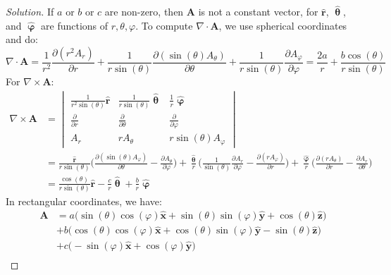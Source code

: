 \documentclass[oneside]{book}
\theoremstyle{mystyle}
\begin{document}
\begin{proof}[Solution]
If $a$ or $b$ or $c$ are non-zero, then $\mathbf{A}$ is not a constant vector, for $\hat{\mathbf{r}}$, $\hat{\boldsymbol{\uptheta}}$, and $\hat{\boldsymbol{\upvarphi}}$ are functions of $r,\theta,\varphi$. To compute $\nabla \cdot \mathbf{A}$, we use spherical coordinates and do:
\begin{equation*}
    \nabla\cdot\mathbf{A}=\frac{1}{r^{2}}\frac{\partial (r^{2}A_{r})}{\partial r}+\frac{1}{r\sin(\theta)}\frac{\partial(\sin(\theta)A_{\theta})}{\partial \theta}+\frac{1}{r\sin(\theta)}\frac{\partial A_{\varphi}}{\partial\varphi}=\frac{2a}{r}+\frac{b\cos(\theta)}{r\sin(\theta)}
\end{equation*}
For $\nabla \times \mathbf{A}$:
\begin{align*}
    \nabla \times \mathbf{A} &= \begin{vmatrix} \frac{1}{r^{2}\sin(\theta)}\hat{\mathbf{r}} & \frac{1}{r\sin(\theta)}\hat{\boldsymbol{\uptheta}} & \frac{1}{r}\hat{\boldsymbol{\upvarphi}}\\ \frac{\partial}{\partial r} & \frac{\partial}{\partial \theta} & \frac{\partial}{\partial \varphi}\\ A_{r} & rA_{\theta} & r\sin(\theta)A_{\varphi} \end{vmatrix}\\
    &= \frac{\hat{\mathbf{r}}}{r\sin(\theta)}\bigg(\frac{\partial (\sin(\theta)A_{\varphi})}{\partial \theta} - \frac{\partial A_{\theta}}{\partial \varphi}\bigg) + \frac{\hat{\boldsymbol{\uptheta}}}{r}\bigg(\frac{1}{\sin(\theta)}\frac{\partial A_{r}}{\partial \varphi} - \frac{\partial (rA_{\varphi})}{\partial r}\bigg)+\frac{\hat{\boldsymbol{\upvarphi}}}{r}\bigg(\frac{\partial (rA_{\theta})}{\partial r} - \frac{\partial A_{r}}{\partial \theta}\bigg)\\
    &= \frac{\cos(\theta)}{r\sin(\theta)}\hat{\mathbf{r}}-\frac{c}{r}\hat{\boldsymbol{\uptheta}}+\frac{b}{r}\hat{\boldsymbol{\upvarphi}}
\end{align*}
In rectangular coordinates, we have:
\begin{align*}
    \mathbf{A}  &= a\big(\sin(\theta)\cos(\varphi)\hat{\mathbf{x}}+\sin(\theta)\sin(\varphi)\hat{\mathbf{y}}+\cos(\theta)\hat{\mathbf{z}}\big)\\
                &+ b\big(\cos(\theta)\cos(\varphi)\hat{\mathbf{x}} + \cos(\theta)\sin(\varphi)\hat{\mathbf{y}}-\sin(\theta)\hat{\mathbf{z}}\big)\\
                &+ c\big(-\sin(\varphi)\hat{\mathbf{x}} + \cos(\varphi)\hat{\mathbf{y}}\big)\\

\end{align*}
\end{proof}
\end{document}
